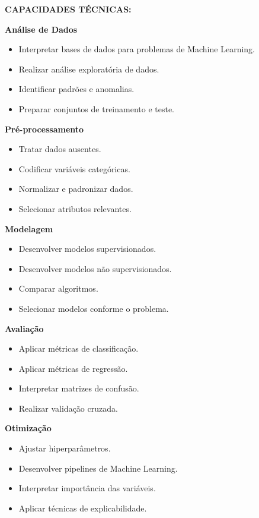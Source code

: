 \textbf{CAPACIDADES TÉCNICAS:}

\textbf{Análise de Dados}

\begin{itemize}
\item Interpretar bases de dados para problemas de Machine Learning.
\item Realizar análise exploratória de dados.
\item Identificar padrões e anomalias.
\item Preparar conjuntos de treinamento e teste.
\end{itemize}

\textbf{Pré-processamento}

\begin{itemize}
\item Tratar dados ausentes.
\item Codificar variáveis categóricas.
\item Normalizar e padronizar dados.
\item Selecionar atributos relevantes.
\end{itemize}

\textbf{Modelagem}

\begin{itemize}
\item Desenvolver modelos supervisionados.
\item Desenvolver modelos não supervisionados.
\item Comparar algoritmos.
\item Selecionar modelos conforme o problema.
\end{itemize}

\textbf{Avaliação}

\begin{itemize}
\item Aplicar métricas de classificação.
\item Aplicar métricas de regressão.
\item Interpretar matrizes de confusão.
\item Realizar validação cruzada.
\end{itemize}

\textbf{Otimização}

\begin{itemize}
\item Ajustar hiperparâmetros.
\item Desenvolver pipelines de Machine Learning.
\item Interpretar importância das variáveis.
\item Aplicar técnicas de explicabilidade.
\end{itemize}


